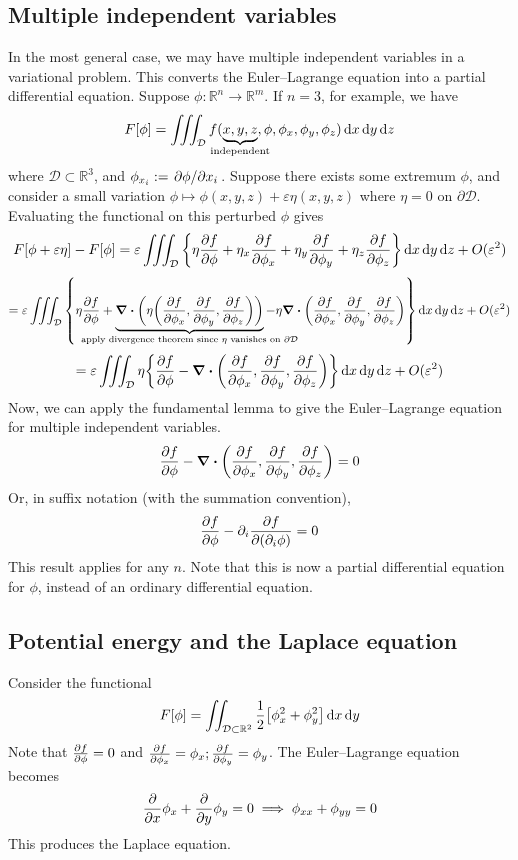 \subsection{Multiple independent variables}
In the most general case, we may have multiple independent variables in a variational problem.
This converts the Euler--Lagrange equation into a partial differential equation.
Suppose \( \phi \colon \mathbb R^n \to \mathbb R^m \).
If \( n = 3 \), for example, we have
\[
	F[\phi] = \iiint_{\mathcal D} f(\underbrace{x, y, z}_{\mathclap{\text{independent}}}, \phi, \phi_x, \phi_y, \phi_z) \dd{x}\dd{y}\dd{z}
\]
where \( \mathcal D \subset \mathbb R^3 \), and \( \phi_{x_i} := \pdv*{\phi}{x_i} \).
Suppose there exists some extremum \( \phi \), and consider a small variation \( \phi \mapsto \phi(x,y,z) + \varepsilon \eta(x,y,z) \) where \( \eta = 0 \) on \( \partial \mathcal D \).
Evaluating the functional on this perturbed \( \phi \) gives
\[
	F[\phi + \varepsilon\eta] - F[\phi] = \varepsilon \iiint_{\mathcal D} \qty{ \eta \pdv{f}{\phi} + \eta_x \pdv{f}{\phi_x} + \eta_y \pdv{f}{\phi_y} + \eta_z \pdv{f}{\phi_z} } \dd{x}\dd{y}\dd{z} + O(\varepsilon^2)
\]
\[
	= \varepsilon \iiint_{\mathcal D} \qty{ \eta \pdv{f}{\phi} + \underbrace{\div(\eta\qty(\pdv{f}{\phi_x}, \pdv{f}{\phi_y}, \pdv{f}{\phi_z}))}_{\mathclap{\text{apply divergence theorem since \( \eta \) vanishes on \( \partial \mathcal D \)}}} - \eta \div(\pdv{f}{\phi_x}, \pdv{f}{\phi_y}, \pdv{f}{\phi_z}) } \dd{x}\dd{y}\dd{z} + O(\varepsilon^2)
\]
\[
	= \varepsilon \iiint_{\mathcal D} \eta \qty{ \pdv{f}{\phi} - \div(\pdv{f}{\phi_x}, \pdv{f}{\phi_y}, \pdv{f}{\phi_z}) } \dd{x}\dd{y}\dd{z} + O(\varepsilon^2)
\]
Now, we can apply the fundamental lemma to give the Euler--Lagrange equation for multiple independent variables.
\[
	\pdv{f}{\phi} - \div(\pdv{f}{\phi_x},\pdv{f}{\phi_y},\pdv{f}{\phi_z}) = 0
\]
Or, in suffix notation (with the summation convention),
\[
	\pdv{f}{\phi} - \partial_i \pdv{f}{(\partial_i \phi)} = 0
\]
This result applies for any \( n \).
Note that this is now a partial differential equation for \( \phi \), instead of an ordinary differential equation.

\subsection{Potential energy and the Laplace equation}
Consider the functional
\[
	F[\phi] = \iint_{\mathcal D \subset \mathbb R^2} \frac{1}{2} \qty[\phi_x^2 + \phi_y^2] \dd{x}\dd{y}
\]
Note that \( \pdv{f}{\phi} = 0 \) and \( \pdv{f}{\phi_x} = \phi_x; \pdv{f}{\phi_y} = \phi_y \).
The Euler--Lagrange equation becomes
\[
	\pdv{x}\phi_x + \pdv{y}\phi_y = 0 \implies \phi_{xx} + \phi_{yy} = 0
\]
This produces the Laplace equation.

